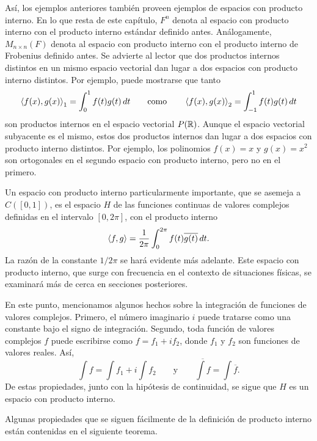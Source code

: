 \documentclass[12pt,a4paper]{book}
\begin{document}
    Así, los ejemplos anteriores también proveen ejemplos de espacios con producto interno. En lo que resta de este capítulo, $F^n$ denota al espacio con producto interno con el producto interno estándar definido antes. Análogamente, $M_{n\times n}(F)$ denota al espacio con producto interno con el producto interno de Frobenius definido antes. Se advierte al lector que dos productos internos distintos en un mismo espacio vectorial dan lugar a dos espacios con producto interno distintos. Por ejemplo, puede mostrarse que tanto
    \begin{equation*}
        \left\langle f(x), g(x) \right\rangle_1=\int_0^1 f(t)g(t)\,dt \qquad\text{como}\qquad \left\langle f(x), g(x) \right\rangle_2=\int_{-1}^{1}f(t)g(t)\,dt
    \end{equation*}
    son productos internos en el espacio vectorial $P(\mathbb{R})$. Aunque el espacio vectorial subyacente es el mismo, estos dos productos internos dan lugar a dos espacios con producto interno distintos. Por ejemplo, los polinomios $f(x)=x$ y $g(x)=x^2$ son ortogonales en el segundo espacio con producto interno, pero no en el primero.

    Un espacio con producto interno particularmente importante, que se asemeja a $C([0,1])$, es el espacio $H$ de las funciones continuas de valores complejos definidas en el intervalo $[0,2\pi]$, con el producto interno
    \begin{equation*}
        \left\langle f, g \right\rangle=\frac{1}{2\pi}\int_0^{2\pi}f(t)\overline{g(t)}\,dt.
    \end{equation*}
    La razón de la constante $1/2\pi$ se hará evidente más adelante. Este espacio con producto interno, que surge con frecuencia en el contexto de situaciones físicas, se examinará más de cerca en secciones posteriores.

    En este punto, mencionamos algunos hechos sobre la integración de funciones de valores complejos. Primero, el número imaginario $i$ puede tratarse como una constante bajo el signo de integración. Segundo, toda función de valores complejos $f$ puede escribirse como $f=f_1+if_2$, donde $f_1$ y $f_2$ son funciones de valores reales. Así,
    \begin{equation*}
        \int f=\int f_1+i\int f_2 \qquad\text{y}\qquad \overline{\int f}=\int \overline{f}.
    \end{equation*}
    De estas propiedades, junto con la hipótesis de continuidad, se sigue que $H$ es un espacio con producto interno.

    Algunas propiedades que se siguen fácilmente de la definición de producto interno están contenidas en el siguiente teorema.
\end{document}
